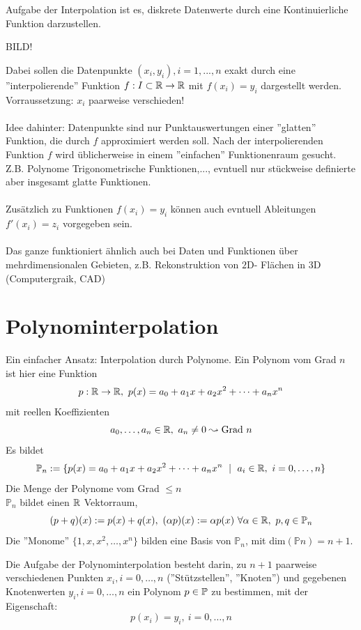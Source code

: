 Aufgabe der Interpolation ist es, diskrete Datenwerte durch eine Kontinuierliche Funktion darzustellen.
\begin{center}
    BILD!
\end{center}
Dabei sollen die Datenpunkte $(x_i,y_i), i=1,...,n$ exakt durch eine ''interpolierende'' Funktion $f:I\subset\mathbb{R} \to\mathbb{R}$ mit 
$f(x_i)=y_i$ dargestellt werden. Vorraussetzung: $x_i$ paarweise verschieden!\\\\
Idee dahinter: Datenpunkte sind nur Punktauswertungen einer ''glatten'' Funktion, die durch $f$ approximiert werden soll. 
Nach der interpolierenden Funktion $f$ wird üblicherweise in einem ''einfachen'' Funktionenraum gesucht. Z.B. Polynome 
Trigonometrische Funktionen,..., evntuell nur stückweise definierte aber insgesamt glatte Funktionen.\\\\
Zusätzlich zu Funktionen $f(x_i)=y_i$ können auch evntuell Ableitungen $f'(x_i)=z_i$ vorgegeben sein.\\\\
Das ganze funktioniert ähnlich auch bei Daten und Funktionen über mehrdimensionalen Gebieten, z.B. Rekonstruktion von $2$D-
Flächen in $3$D (Computergraik, CAD) 

\section{Polynominterpolation}
Ein einfacher Ansatz: Interpolation durch Polynome. 
Ein Polynom vom Grad $n$ ist hier eine Funktion\\
\[p:\mathbb{R} \to \mathbb{R} , \ p(x)= a_0+a_1x+a_2x^2+\dots+a_nx^n\] mit reellen Koeffizienten \[a_0,\dots,a_n\in\mathbb{R},\ a_n\neq 0 \leadsto 
\text{Grad } n\]
Es bildet
\[\mathbb{P}_n:=\{p(x)=a_0+a_1x+a_2x^2+\dots+a_nx^n \ \mid \ a_i\in\mathbb{R} ,\ i=0,\dots, n\}\] Die Menge der Polynome vom Grad 
$\leq n$\\
$\mathbb{P}_n$ bildet einen $\mathbb{R}$ Vektorraum, $$(p+q)(x):=p(x)+q(x), \ (\alpha p)(x):=\alpha p(x)\  \forall \alpha\in\R,\ 
p,q\in\Pol_n$$
Die ''Monome'' $\{1,x,x^2,\dots,x^n\}$ bilden eine Basis von $\mathbb{P}_n$, mit dim$(\mathbb{P}n)=n+1$.
\begin{definition}
    Die Aufgabe der Polynominterpolation besteht darin, zu $n+1$ paarweise verschiedenen Punkten $x_i, i=0,\dots, n$ 
    (''Stützstellen'', ''Knoten'') und gegebenen Knotenwerten $y_i, i=0, \dots, n$ ein Polynom $p\in\mathbb{P}$ zu bestimmen, mit 
    der Eigenschaft: \[p(x_i) = y_i, \ i=0,\dots,n\]
\end{definition}

